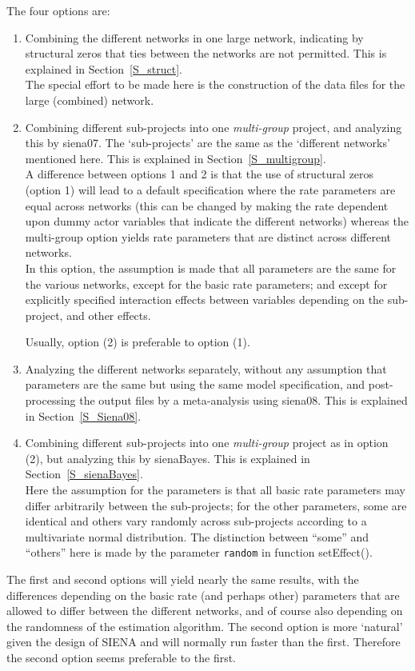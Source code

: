 \documentclass[a4paper,fleqn,11pt]{article}
\newcommand{\+}{\, + \,}
\newcommand{\sfn}[1]{\textsf{#1}}
\newcommand{\SI}{{\sf SIENA }}
\begin{document}
\noindent
The four options are:
\begin{enumerate}
\item Combining the different networks in one large network,
      indicating by structural zeros that ties between the
      networks are not permitted.
      This is explained in Section~\ref{S_struct}.\\
      The special effort to be made here is the construction
      of the data files for the large (combined) network.
\item Combining different sub-projects
      into one \emph{multi-group} project,
      and analyzing this by \sfn{siena07}.
      The `sub-projects' are the same as the `different networks'
      mentioned here.
      This is explained in Section~\ref{S_multigroup}.\\
      A difference between options 1 and 2 is that the use
      of structural zeros (option 1) will lead to a default specification
      where the rate parameters are equal across networks
      (this can be changed by making the rate dependent upon dummy actor
      variables that indicate the different networks)
      whereas the multi-group option yields rate parameters
      that are distinct across different networks.\\
      In this option, the assumption is made that all parameters
      are the same for the various networks, except for the basic rate
      parameters; and except for explicitly specified interaction
      effects between variables depending on the sub-project, and other effects.
      
      Usually, option (2) is preferable to option (1).
\item Analyzing the different networks separately, without any assumption
      that parameters are the same but using the same model specification,
      and post-processing the output files by a meta-analysis
      using \textsf{siena08}.
      This is explained in Section~\ref{S_Siena08}.
\item Combining different sub-projects into one \emph{multi-group} project
      as in option (2), but analyzing this by \sfn{sienaBayes}.
      This is explained in Section~\ref{S_sienaBayes}.\\
      Here the assumption for the parameters is that all basic rate parameters
      may differ arbitrarily between the sub-projects;
      for the other parameters, some are identical and others vary randomly across
      sub-projects according to a multivariate normal distribution.
      The distinction between ``some'' and ``others'' here is made by
      the parameter \texttt{random} in function \sfn{setEffect()}.
\end{enumerate}
The first and second options will yield nearly the same results, with the
differences depending on the basic rate (and perhaps other) parameters
that are
allowed to differ between the different networks, and of course
also depending on the randomness of the estimation algorithm.
The second option is more `natural' given the design of \SI and
will normally run faster than the first.
Therefore the second option seems preferable to the first.
\end{document}
